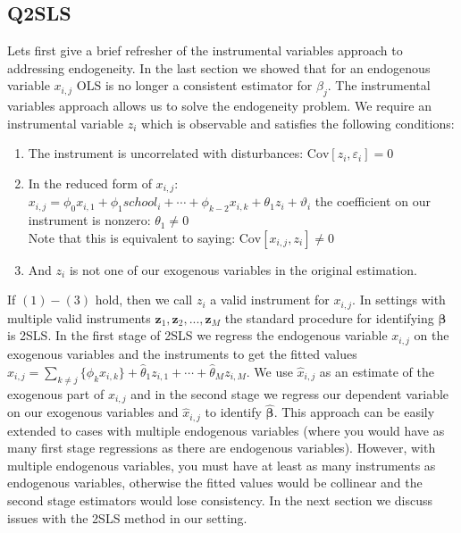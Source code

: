 \documentclass[12pt]{article}
\newcommand{\Cov}{\mathrm{Cov}}
\begin{document}
\subsection{Q2SLS}
Lets first give a brief refresher of the instrumental variables approach to addressing endogeneity. In the last section we showed that for an endogenous variable $x_{i,j}$ OLS is no longer a consistent estimator for $\beta_j$. The instrumental variables approach allows us to solve the endogeneity problem. We require an instrumental variable $z_i$ which is observable and satisfies the following conditions:
\begin{spacing}{1}
\begin{enumerate}[label={(\arabic*)}]
	\item The instrument is uncorrelated with disturbances: $\Cov[z_i, \varepsilon_i] = 0$ \
	\item In the reduced form of $x_{i,j}$: $x_{i,j} = \phi_0 x_{i,1} + \phi_1 school_i + \cdots + \phi_{k-2}x_{i,k} + \theta_1 z_i + \vartheta_i$ the coefficient on our instrument is nonzero: $\theta_1 \ne 0$ \\
	Note that this is equivalent to saying: $\Cov[x_{i,j}, z_i] \ne 0$ \
	\item And $z_i$ is not one of our exogenous variables in the original estimation.
\end{enumerate}
\end{spacing}
\noindent If $(1)-(3)$ hold, then we call $z_i$ a valid instrument for $x_{i,j}$. In settings with multiple valid instruments $\bm{z}_1, \bm{z}_2, ..., \bm{z}_M$ the standard procedure for identifying $\bm{\beta}$ is 2SLS. In the first stage of 2SLS we regress the endogenous variable $x_{i,j}$ on the exogenous variables and the instruments to get the fitted values $\hat{x}_{i,j} =  \sum_{k \ne j}\{\hat{\phi}_k x_{i,k}\} + \hat{\theta}_1 z_{i,1} + \cdots + \hat{\theta}_M z_{i,M}$. We use $\hat{x}_{i,j}$ as an estimate of the exogenous part of $x_{i,j}$ and in the second stage we regress our dependent variable on our exogenous variables and $\hat{x}_{i,j}$ to identify $\hat{\bm{\beta}}$. This approach can be easily extended to cases with multiple endogenous variables (where you would have as many first stage regressions as there are endogenous variables). However, with multiple endogenous variables, you must have at least as many instruments as endogenous variables, otherwise the fitted values would be collinear and the second stage estimators would lose consistency. In the next section we discuss issues with the 2SLS method in our setting.
\end{document}
